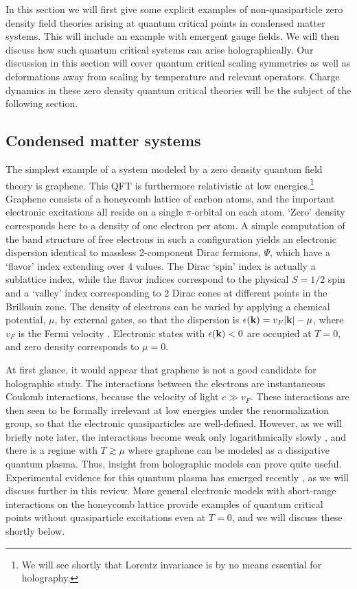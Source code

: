 \documentclass[10pt, oneside]{book}
\begin{document}
\begin{doublespace}
In this section we will first give some explicit examples of non-quasiparticle zero density field theories arising at quantum critical points in condensed matter systems. This will include an example with emergent gauge fields. We will then discuss how such quantum critical systems can arise holographically. Our discussion in this section will cover quantum critical scaling symmetries as well as deformations away from scaling by temperature and relevant operators. Charge dynamics in these zero density quantum critical theories will be the subject of the following section.

\subsection{Condensed matter systems}
\label{sec:sit}

The simplest example of a system modeled by a zero density quantum field theory is graphene. This QFT is furthermore relativistic at low energies.\footnote{We will see shortly that Lorentz invariance is by no means essential for holography.} Graphene consists of a honeycomb lattice of carbon atoms, and the important electronic  excitations all reside on a single $\pi$-orbital
on each atom. `Zero' density corresponds here to a density of one electron per atom. A simple computation of the band structure of free
electrons in such a configuration yields an electronic dispersion identical to massless 2-component Dirac fermions, $\Psi$, which have a `flavor' index extending
over 4 values. The Dirac `spin' index is actually a sublattice index, while the flavor indices correspond to the physical $S=1/2$ spin and a `valley' index
corresponding to 2 Dirac cones at different points in the Brillouin zone.
The density of electrons can be varied by applying a chemical potential, $\mu$, by external gates, so that the dispersion
is $\epsilon ({\bf k}) = v_F |{\bf k}| - \mu$, where $v_F$ is the Fermi velocity \cite{netormp}. 
Electronic states with $\epsilon ({\bf k}) < 0$ are occupied at $T=0$,
and zero density corresponds to $\mu=0$. 

At first glance, it would appear that graphene is not a good candidate for holographic study. The interactions between the electrons 
are instantaneous Coulomb interactions, because the velocity of light $c \gg v_F$. These interactions 
are then seen to be formally irrelevant at low energies under the renormalization group, so that the electronic quasiparticles are well-defined. However, as we will briefly note later,
the interactions become weak only logarithmically slowly \cite{Guinea94,Fritz08}, and there is a regime with $T \gtrsim \mu$ where graphene can be modeled as a dissipative
quantum plasma.  Thus, insight from holographic models can prove quite useful.   Experimental evidence for this quantum plasma has emerged recently \cite{Crossno1058}, as we will discuss further in this review. More general electronic models
with short-range interactions on the honeycomb lattice provide examples of quantum critical points without quasiparticle excitations even at $T=0$,
and we will discuss these shortly below.


\end{doublespace}
\end{document}
